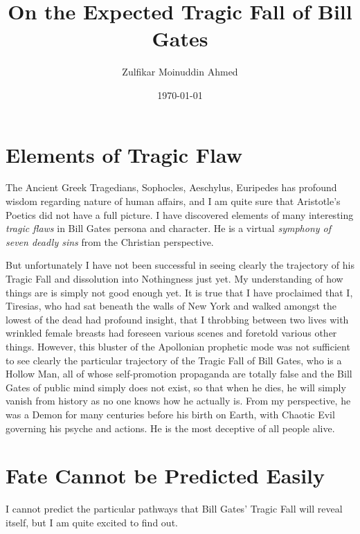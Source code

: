 \documentclass{amsart}
\title{On the Expected Tragic Fall of Bill Gates}
\author{Zulfikar Moinuddin Ahmed}
\date{\today}
\begin{document}
\maketitle

\section{Elements of Tragic Flaw}

The Ancient Greek Tragedians, Sophocles, Aeschylus, Euripedes has profound wisdom regarding nature of human affairs, and I am quite sure that Aristotle's Poetics did not have a full picture.  I have discovered elements of many interesting {\em tragic flaws} in Bill Gates persona and character.  He is a virtual {\em symphony of seven deadly sins} from the Christian perspective.  

But unfortunately I have not been successful in seeing clearly the trajectory of his Tragic Fall and dissolution into Nothingness just yet.  My understanding of how things are is simply not good enough yet.  It is true that I have proclaimed that I, Tiresias, who had sat beneath the walls of New York and walked amongst the lowest of the dead had profound insight, that I throbbing between two lives with wrinkled female breasts had foreseen various scenes and foretold various other things.  However, this bluster of the Apollonian prophetic mode was not sufficient to see clearly the particular trajectory of the Tragic Fall of Bill Gates, who is a Hollow Man, all of whose self-promotion propaganda are totally false and the Bill Gates of public mind simply does not exist, so that when he dies, he will simply vanish from history as no one knows how he actually is.  From my perspective, he was a Demon for many centuries before his birth on Earth, with Chaotic Evil governing his psyche and actions.  He is the most deceptive of all people alive. 

\section{Fate Cannot be Predicted Easily}

I cannot predict the particular pathways that Bill Gates' Tragic Fall will reveal itself, but I am quite excited to find out.
\end{document}
